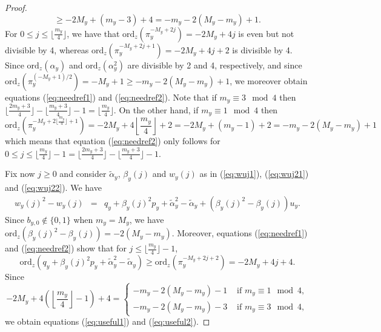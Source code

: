 \documentclass{amsart}
\numberwithin{equation}{section}
\numberwithin{table}{section}
\theoremstyle{plain}
\theoremstyle{definition}
\theoremstyle{remark}
\begin{document}
\begin{proof}
$$\ge -2M_y+(m_y-3)+4 =-m_y -2(M_y-m_y)+1.$$
For $0\le j \le \lfloor\frac{m_y}{4}\rfloor$, we have that $\mathrm{ord}_z(\pi_y^{-M_y+2j}) = -2M_y+4j$ is even but not divisible by 4,
whereas $\mathrm{ord}_z(\pi_y^{-M_y+2j+1}) = -2M_y+4j+2$ is divisible by 4. Since $\mathrm{ord}_z(\alpha_y)$ and $\mathrm{ord}_z(\alpha_y^2)$ are divisible by 2 and 4, respectively, and since $\mathrm{ord}_z(\pi_y^{(-M_y+1)/2}) = -M_y+1 \ge -m_y -2(M_y-m_y)+1$, we moreover obtain equations (\ref{eq:needref1}) and (\ref{eq:needref2}).
Note that if $m_y\equiv 3\mod 4$ then $\lfloor\frac{2m_y+3}{4}\rfloor - \lfloor\frac{m_y+3}{4}\rfloor - 1 =\lfloor\frac{m_y}{4}\rfloor $. On the other hand, if $m_y\equiv 1\mod 4$ then 
$$\mathrm{ord}_z(\pi_y^{-M_y+2\lfloor\frac{m_y}{4}\rfloor +1}) = -2M_y+4 \textstyle{\left\lfloor\frac{m_y}{4}\right\rfloor}+ 2
=-2M_y + (m_y-1)+2 = -m_y -2(M_y-m_y)+1$$
which means that equation (\ref{eq:needref2}) only follows for $0\le j \le \lfloor\frac{m_y}{4}\rfloor - 1 = \lfloor\frac{2m_y+3}{4}\rfloor - \lfloor\frac{m_y+3}{4}\rfloor - 1$.

Fix now $j\ge 0$ and consider $\widetilde{\alpha}_y$, $\beta_y(j)$ and $w_y(j)$ as in (\ref{eq:wuj1}), (\ref{eq:wuj21}) and (\ref{eq:wuj22}). We have
\begin{eqnarray*}
w_y(j)^2-w_y(j) &=& q_y +\beta_y(j)^2 p_y + \widetilde{\alpha}_y^2-\widetilde{\alpha}_y + (\beta_y(j)^2-\beta_y(j))u_y.
\end{eqnarray*}
Since $b_{y,0}\not\in\{0,1\}$ when $m_y=M_y$, we have $\mathrm{ord}_z(\beta_y(j)^2-\beta_y(j))=-2(M_y-m_y)$. Moreover, equations (\ref{eq:needref1}) and (\ref{eq:needref2}) show that for $j\le \lfloor \frac{m_y}{4}\rfloor -1$,
$$\mathrm{ord}_z (q_y +\beta_y(j)^2 p_y + \widetilde{\alpha}_y^2-\widetilde{\alpha}_y)\ge \mathrm{ord}_z(\pi_y^{-M_y+2j+2})=-2M_y+4j+4.$$
Since
$$-2M_y+4\left(\textstyle{\left\lfloor \frac{m_y}{4}\right\rfloor}-1\right) +4
=\left\{\begin{array}{ll}
-m_y -2(M_y-m_y)-1 & \mbox{ if } m_y\equiv 1\mod 4,\\
-m_y -2(M_y-m_y)-3 & \mbox{ if } m_y\equiv 3\mod 4,
\end{array}\right.$$
we obtain equations (\ref{eq:useful1}) and (\ref{eq:useful2}).
\end{proof}
\end{document}
